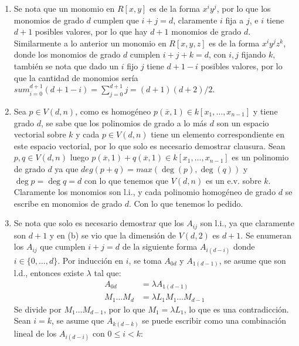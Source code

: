 \begin{sol}{2.35}
    \begin{enumerate}
        \item Se nota que un monomio en \(R[x,y]\) es de la forma \(x^iy^j\), por lo que los monomios de grado \(d\) cumplen que \(i+j=d\), claramente \(i\) fija a \(j\), e \(i\) tiene \(d+1\) posibles valores, por lo que hay \(d+1\) monomios de grado \(d\). Similarmente a lo anterior un monomio en \(R[x,y,z]\) es de la forma \(x^iy^jz^k\), donde los monomios de grado \(d\) cumplen \(i+j+k=d\), con \(i,j\) fijando \(k\), también se nota que dado un \(i\) fijo \(j\) tiene \(d+1-i\) posibles valores, por lo que la cantidad de monomios sería \(sum_{i=0}^{d+1}(d+1-i)=\sum_{j=0}^{d+1}j=(d+1)(d+2)/2\).
        \item Sea \(p\in V(d,n)\), como es homogéneo \(p(\overline{x},1)\in k[x_1,\dots ,x_{n-1}]\) y tiene grado \(d\), se sabe que los polinomios de grado a lo más \(d\) son un espacio vectorial sobre \(k\) y cada \(p\in V(d,n)\) tiene un elemento correspondiente en este espacio vectorial, por lo que solo es necesario demostrar clausura. Sean \(p,q\in V(d,n)\) luego \(p(\overline{x},1)+q(\overline{x},1)\in k[x_1,\dots ,x_{n-1}]\) es un polinomio de grado \(d\) ya que \(deg(p+q)=max(\deg(p),\deg(q))\) y \(\deg p=\deg q=d\) con lo que tenemos que \(V(d,n)\) es un e.v. sobre \(k\). Claramente los monomios son l.i., y cada polinomio homogéneo de grado \(d\) se escribe en monomios de grado \(d\). Con lo que tenemos lo pedido.
        \item Se nota que solo es necesario demostrar que los \(A_{ij}\) son l.i., ya que claramente son \(d+1\) y en (b) se vio que la dimensión de \(V(d,2)\) es \(d+1\). Se enumeran los \(A_{ij}\) que cumplen \(i+j=d\) de la siguiente forma \(A_{i(d-i)}\) donde \(i\in\{0,\dots ,d\}\). Por inducción en \(i\), se toma \(A_{0d}\) y \(A_{1(d-1)}\), se asume que son l.d., entonces existe \(\lambda\) tal que:
              \begin{align*}
                  A_{0d}       & = \lambda A_{1(d-1)}          \\
                  M_1\dots M_d & = \lambda L_1M_1\dots M_{d-1}
              \end{align*}
              Se divide por \(M_1\dots M_{d-1}\), por lo que \(M_1=\lambda L_1\), lo que es una contradicción. Sean \(i=k\), se asume que \(A_{k(d-k)}\) se puede escribir como una combinación lineal de los \(A_{i(d-i)}\) con \(0\leq i<k\):
              \begin{align*}

\end{align*}
\end{enumerate}
\end{sol}
